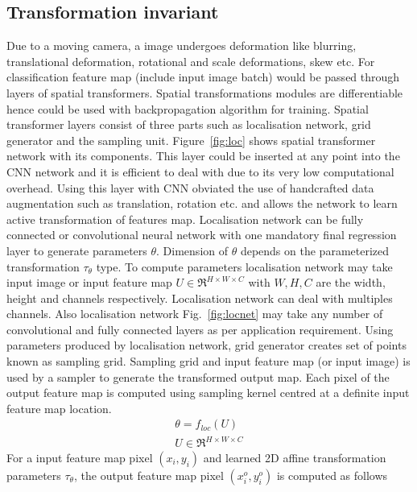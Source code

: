 \documentclass[conference]{IEEEtran}
\begin{document}
\subsection{Transformation invariant}
Due to a moving camera, a image undergoes deformation like blurring, translational deformation, rotational
and scale deformations, skew etc. For classification feature map (include input image batch) would be passed through layers of 
spatial transformers. Spatial transformations modules are differentiable hence could be used with 
backpropagation algorithm for training. Spatial transformer layers consist of three parts such as 
localisation network, grid generator and the sampling unit. Figure~\ref{fig:loc} shows spatial transformer network with its components. This layer could be inserted at any point 
into the CNN network and it is efficient to deal with due to its very low computational overhead. Using
this layer with CNN obviated the use of handcrafted data augmentation such as translation, rotation etc.
and allows the network to learn active transformation of features map. Localisation network can be fully connected or convolutional 
neural network with one mandatory final regression layer to generate parameters $\theta$. Dimension of 
$ \theta $ depends on the parameterized transformation $ \tau_{\theta} $ type. To compute parameters 
localisation network may take input image or input feature map $ U \in \Re^{H \times W \times C} $ with 
$ W, H, C $ are the width, height and channels respectively. Localisation network can deal with multiples 
channels. Also localisation network Fig.~\ref{fig:locnet} may take any number of convolutional and fully connected layers as per application requirement. Using parameters produced by localisation network, grid generator creates set of points known 
as sampling grid. Sampling grid and input feature map (or input image) is used by a sampler to generate 
the transformed output map. Each pixel of the output feature map is computed using sampling kernel
centred at a definite input feature map location.
\begin{equation}
\label{eq:relation}
	\begin{aligned}
		\theta = f_{loc}(U) \\
		U \in \Re^{H \times W \times C}
	\end{aligned}
\end{equation}
For a input feature map pixel $ (x_{i}, y_{i})$ and learned 2D affine transformation parameters $ \tau_{\theta} $, the output 
feature map pixel $ (x_{i}^{o}, y_{i}^{o})$ is computed as follows
\end{document}
